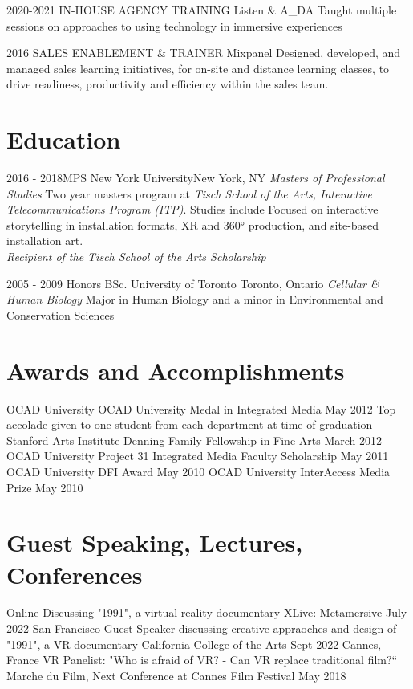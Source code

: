\documentclass[11pt,a4paper,sans]{moderncv}   %
\begin{document}
\cventry
  {2020-2021}
  {IN-HOUSE AGENCY TRAINING}
  {Listen \& A\_DA}{}
  {}{}{}
  {Taught multiple sessions on approaches to using technology in immersive experiences}

\cventry
  {2016}
  {SALES ENABLEMENT \& TRAINER}
  {Mixpanel}{}
  {}{}{}
  {Designed, developed, and managed sales learning initiatives, for on-site and distance learning classes, to drive readiness, productivity and efficiency within the sales team.}
  
\section{Education}

\cventry
  {2016 - 2018}{MPS}
  {New York University}{New York, NY}
  {\textit{Masters of Professional Studies}}
  {Two year masters program at \textit{Tisch School of the Arts, Interactive Telecommunications Program (ITP)}.  Studies include Focused on interactive storytelling in installation formats, XR and
  360° production, and site-based installation art. \\\textit{Recipient of the Tisch School of the Arts Scholarship }}

\cventry
  {2005 - 2009}
  {Honors BSc.}
  {University of Toronto}
  {Toronto, Ontario}
  {\textit{Cellular \& Human Biology}}
  {Major in Human Biology and a minor in Environmental and Conservation Sciences}

  \section{Awards and Accomplishments}
\cventry
  {}{OCAD University}
  {OCAD University Medal in Integrated Media}
  {May 2012}{}
  {Top accolade given to one student from each department at time of graduation}
\cventry
  {}{Stanford Arts Institute}
  {Denning Family Fellowship in Fine Arts}
  {March 2012}{}{}
\cventry
  {}{OCAD University}
  {Project 31 Integrated Media Faculty Scholarship}
  {May 2011}{}{}
\cventry
  {}{OCAD University}
  {DFI Award}
  {May 2010}{}{}
\cventry
  {}{OCAD University}
  {InterAccess Media Prize}
  {May 2010}{}{}

\section{Guest Speaking, Lectures, Conferences}
\cventry
  {Online}
  {Discussing "1991", a virtual reality documentary}
  {XLive: Metamersive}
  {July 2022}{}
  {}
\cventry
  {San Francisco}
  {Guest Speaker discussing creative appraoches and design of "1991", a VR documentary}
  {California College of the Arts}
  {Sept 2022}{}
  {}
\cventry
  {Cannes, France}
  {VR Panelist: "Who is afraid of VR? - Can VR replace traditional film?“}
  {Marche du Film, Next Conference at Cannes Film Festival}
  {May 2018}{}
  {}
\end{document}
